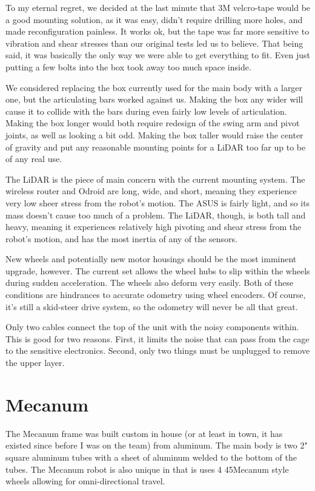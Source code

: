 To my eternal regret, we decided at the last minute that 3M velcro-tape would be a good mounting solution, as it was easy, didn't require drilling more holes, and made reconfiguration painless. It works ok, but the tape was far more sensitive to vibration and shear stresses than our original tests led us to believe. That being said, it was basically the only way we were able to get everything to fit. Even just putting a few bolts into the box took away too much space inside.

We considered replacing the box currently used for the main body with a larger one, but the articulating bars worked against us. Making the box any wider will cause it to collide with the bars during even fairly low levels of articulation. Making the box longer would both require redesign of the swing arm and pivot joints, as well as looking a bit odd. Making the box taller would raise the center of gravity and put any reasonable mounting points for a LiDAR too far up to be of any real use.

The LiDAR is the piece of main concern with the current mounting system. The wireless router and Odroid are long, wide, and short, meaning they experience very low sheer stress from the robot's motion. The ASUS is fairly light, and so its mass doesn't cause too much of a problem. The LiDAR, though, is both tall and heavy, meaning it experiences relatively high pivoting and shear stress from the robot's motion, and has the most inertia of any of the sensors.

New wheels and potentially new motor housings should be the most imminent upgrade, however. The current set allows the wheel hubs to slip within the wheels during sudden acceleration. The wheels also deform very easily. Both of these conditions are hindrances to accurate odometry using wheel encoders. Of course, it's still a skid-steer drive system, so the odometry will never be all that great.

Only two cables connect the top of the unit with the noisy components within. This is good for two reasons. First, it limits the noise that can pass from the cage to the sensitive electronics. Second, only two things must be unplugged to remove the upper layer.

\section{Mecanum}

The Mecanum frame was built custom in house (or at least in town, it has existed since before I was on the team) from aluminum. The main body is two 2" square aluminum tubes with a sheet of aluminum welded to the bottom of the tubes. The Mecanum robot is also unique in that is uses 4 45\degree  Mecanum style wheels allowing for omni-directional travel.

